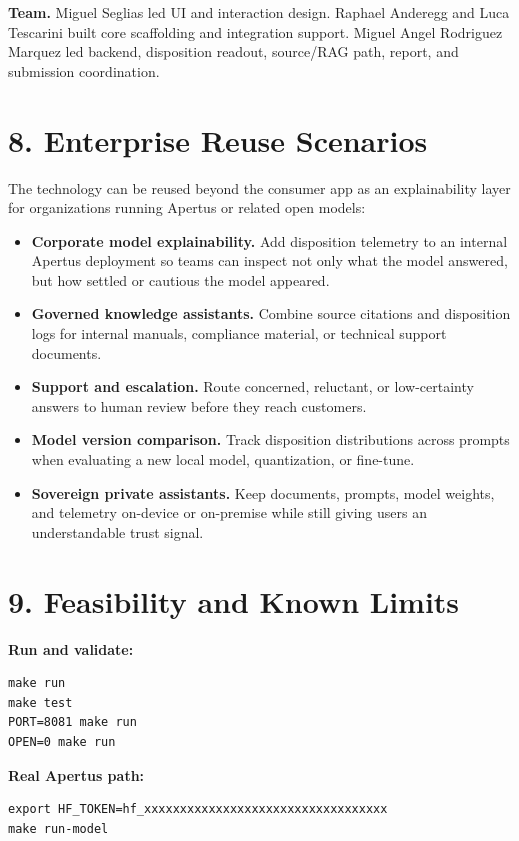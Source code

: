 \documentclass[10pt,a4paper]{article}
\newcommand{\sectionrule}{\vspace{-2pt}{\color{canisLine}\hrule}\vspace{4pt}}
\begin{document}
\textbf{Team.} Miguel Seglias led UI and interaction design. Raphael Anderegg and Luca Tescarini built core scaffolding and integration support. Miguel Angel Rodriguez Marquez led backend, disposition readout, source/RAG path, report, and submission coordination.

\section*{8. Enterprise Reuse Scenarios}
\sectionrule
The technology can be reused beyond the consumer app as an explainability layer for organizations running Apertus or related open models:
\begin{itemize}
\item \textbf{Corporate model explainability.} Add disposition telemetry to an internal Apertus deployment so teams can inspect not only what the model answered, but how settled or cautious the model appeared.
\item \textbf{Governed knowledge assistants.} Combine source citations and disposition logs for internal manuals, compliance material, or technical support documents.
\item \textbf{Support and escalation.} Route concerned, reluctant, or low-certainty answers to human review before they reach customers.
\item \textbf{Model version comparison.} Track disposition distributions across prompts when evaluating a new local model, quantization, or fine-tune.
\item \textbf{Sovereign private assistants.} Keep documents, prompts, model weights, and telemetry on-device or on-premise while still giving users an understandable trust signal.
\end{itemize}

\section*{9. Feasibility and Known Limits}
\sectionrule
\textbf{Run and validate:}
\begin{verbatim}
make run
make test
PORT=8081 make run
OPEN=0 make run
\end{verbatim}

\textbf{Real Apertus path:}
\begin{verbatim}
export HF_TOKEN=hf_xxxxxxxxxxxxxxxxxxxxxxxxxxxxxxxxxx
make run-model
\end{verbatim}
\end{document}
